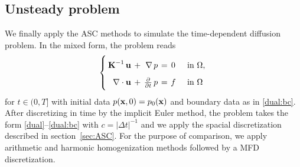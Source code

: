 \subsection{Unsteady problem}

We finally apply the ASC methods to simulate the time-dependent diffusion problem. In the mixed form, the problem reads
\begin{equation}\label{dual_transient}
	\arraycolsep=2pt\def\arraystretch{1.7}
	\left\{\begin{array}{rcrccl}
		\vect K^{-1}\,\vect u & + & \nabla\,p & = & 0 &\quad\text{in } \Omega , \\
		\nabla\cdot\vect u    & + & \frac{\partial}{\partial t}\,p      & = & f &\quad\text{in } \Omega
	\end{array}\right.
\end{equation}%
for $t\in(0, T]$ with initial data $p(\boldsymbol{\mathbf{x}}, 0) = p_0(\boldsymbol{\mathbf{x}})$ and boundary data as in \eqref{dual:bc}. After discretizing in time by the implicit Euler method, the problem takes the form \eqref{dual}--\eqref{dual:bc} with $c=|\Delta t|^{-1}$ and we apply the spacial discretization described in section~\ref{sec:ASC}. For the purpose of comparison, we apply arithmetic and harmonic homogenization methods followed by a MFD discretization.




